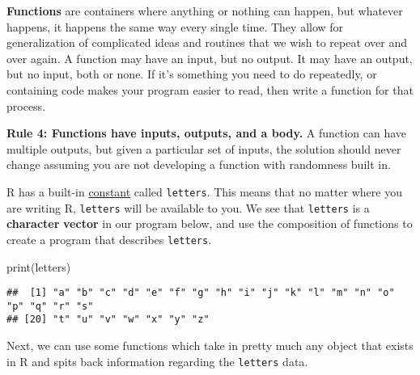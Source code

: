 \documentclass[
]{book}
\newenvironment{Shaded}{\begin{snugshade}}{\end{snugshade}}
\newcommand{\FunctionTok}[1]{\textcolor[rgb]{0.00,0.00,0.00}{#1}}
\newcommand{\NormalTok}[1]{#1}
\begin{document}
\textbf{Functions} are containers where anything or nothing can happen, but whatever happens, it happens the same way every single time. They allow for generalization of complicated ideas and routines that we wish to repeat over and over again. A function may have an input, but no output. It may have an output, but no input, both or none. If it's something you need to do repeatedly, or containing code makes your program easier to read, then write a function for that process.

\textbf{Rule 4: Functions have inputs, outputs, and a body.} A function can have multiple outputs, but given a particular set of inputs, the solution should never change assuming you are not developing a function with randomness built in.

R has a built-in \href{https://stat.ethz.ch/R-manual/R-devel/library/base/html/Constants.html}{constant} called \texttt{letters}. This means that no matter where you are writing R, \texttt{letters} will be available to you. We see that \texttt{letters} is a \textbf{character} \textbf{vector} in our program below, and use the composition of functions to create a program that describes \texttt{letters}.

\begin{Shaded}
\begin{Highlighting}[]
\FunctionTok{print}\NormalTok{(letters)}
\end{Highlighting}
\end{Shaded}

\begin{verbatim}
##  [1] "a" "b" "c" "d" "e" "f" "g" "h" "i" "j" "k" "l" "m" "n" "o" "p" "q" "r" "s"
## [20] "t" "u" "v" "w" "x" "y" "z"
\end{verbatim}

Next, we can use some functions which take in pretty much any object that exists in R and spits back information regarding the \texttt{letters} data.
\end{document}
